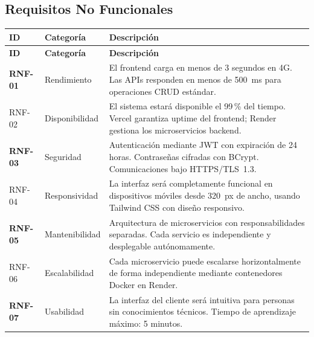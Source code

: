 \documentclass[12pt,a4paper]{article}
\begin{document}
\subsection{Requisitos No Funcionales}

\begin{center}
\begin{longtable}{|C{1.6cm}|L{3cm}|L{9.4cm}|}
\hline
{}
\color{white}\textbf{ID} &
\color{white}\textbf{Categor\'ia} &
\color{white}\textbf{Descripci\'on} \\
\hline
\endfirsthead
\hline
{}
\color{white}\textbf{ID} &
\color{white}\textbf{Categor\'ia} &
\color{white}\textbf{Descripci\'on} \\
\hline
\endhead

\textbf{RNF-01} & Rendimiento &
El frontend carga en menos de 3 segundos en 4G. Las APIs responden
en menos de 500~ms para operaciones CRUD est\'andar. \\
\hline
RNF-02 & Disponibilidad &
El sistema estar\'a disponible el 99\,\% del tiempo. Vercel garantiza
uptime del frontend; Render gestiona los microservicios backend. \\
\hline
{}
\textbf{RNF-03} & Seguridad &
Autenticaci\'on mediante JWT con expiraci\'on de 24 horas. Contrase\~nas
cifradas con BCrypt. Comunicaciones bajo HTTPS/TLS~1.3. \\
\hline
RNF-04 & Responsividad &
La interfaz ser\'a completamente funcional en dispositivos m\'oviles desde
320~px de ancho, usando Tailwind CSS con dise\~no responsivo. \\
\hline
{}
\textbf{RNF-05} & Mantenibilidad &
Arquitectura de microservicios con responsabilidades separadas. Cada
servicio es independiente y desplegable aut\'onomamente. \\
\hline
RNF-06 & Escalabilidad &
Cada microservicio puede escalarse horizontalmente de forma independiente
mediante contenedores Docker en Render. \\
\hline
{}
\textbf{RNF-07} & Usabilidad &
La interfaz del cliente ser\'a intuitiva para personas sin conocimientos
t\'ecnicos. Tiempo de aprendizaje m\'aximo: 5 minutos. \\
\hline
\end{longtable}
\end{center}

\newpage

\end{document}
